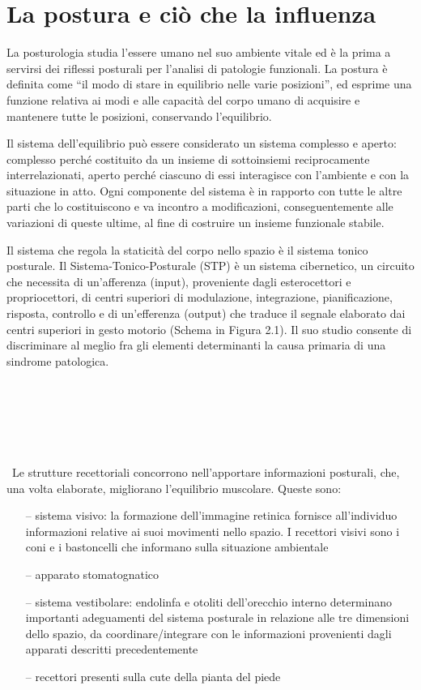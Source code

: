\chapter{La postura e ciò che la influenza}

La posturologia studia l’essere umano nel suo ambiente vitale ed è la prima a servirsi dei riflessi posturali per l’analisi di patologie funzionali. La postura è definita come “il modo di stare in equilibrio nelle varie posizioni”, ed esprime una funzione relativa ai modi e alle capacità del corpo umano di acquisire e mantenere tutte le posizioni, conservando l’equilibrio. 

Il sistema dell’equilibrio può essere considerato un sistema complesso e aperto: complesso perché costituito da un insieme di sottoinsiemi reciprocamente interrelazionati, aperto perché ciascuno di essi interagisce con l’ambiente e con la situazione in atto. Ogni componente del sistema è in rapporto con tutte le altre parti che lo costituiscono e va incontro a modificazioni, conseguentemente alle variazioni di queste ultime, al fine di costruire un insieme funzionale stabile. 

Il sistema che regola la staticità del corpo nello spazio è il sistema tonico posturale. Il Sistema-Tonico-Posturale (STP) è un sistema cibernetico, un circuito che necessita di un’afferenza (input), proveniente dagli esterocettori e propriocettori, di centri superiori di modulazione, integrazione, pianificazione, risposta, controllo e di un’efferenza (output) che traduce il segnale elaborato dai centri superiori in gesto motorio (Schema in Figura 2.1). Il suo studio consente di discriminare al meglio fra gli elementi determinanti la causa primaria di una sindrome patologica. 
\\\ \\\ \\\ \\\ \\\ \\\ \\\
Le strutture recettoriali concorrono nell’apportare informazioni posturali, che, una volta elaborate, migliorano l’equilibrio muscolare. Queste sono:

 \begin{itemize}
 \itemsep-0.6em 
 \item[--]sistema visivo: la formazione dell’immagine retinica fornisce all’individuo informazioni relative ai suoi movimenti nello spazio. I recettori visivi sono i coni e i bastoncelli che informano sulla situazione ambientale
 \item[--]apparato stomatognatico
 \item[--]sistema vestibolare: endolinfa e otoliti dell’orecchio interno determinano importanti adeguamenti del sistema posturale in relazione alle tre dimensioni dello spazio, da coordinare/integrare con le informazioni provenienti dagli apparati descritti precedentemente
 \item[--]recettori presenti sulla cute della pianta del piede
 \end{itemize}
 
